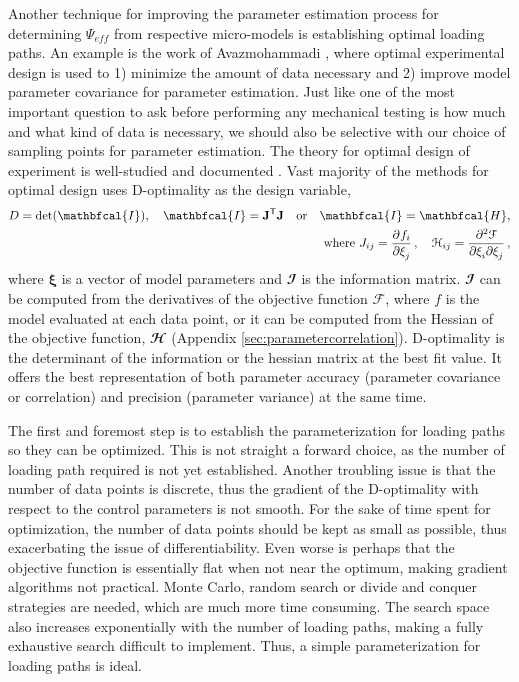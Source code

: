 	Another technique for improving the parameter estimation process for determining $\Psi_{eff}$ from respective micro-models is establishing optimal loading paths. An example is the work of Avazmohammadi \cite{Avazmohammadi2017b}, where optimal experimental design is used to 1) minimize the amount of data necessary and 2) improve model parameter covariance for parameter estimation. Just like one of the most important question to ask before performing any mechanical testing is how much and what kind of data is necessary, we should also be selective with our choice of sampling points for parameter estimation. The theory for optimal design of experiment is well-studied and documented \cite{lanir_optimal_1996, zhu_d_2014}. Vast majority of the methods for optimal design uses D-optimality as the design variable,
\begin{equation}\label{eqn:doptimality}
\begin{aligned}
D = \det(\mathbfcal{I}), \quad \mathbfcal{I} = \mathbf{J}^\mathsf{T}\mathbf{J} \quad \mathrm{or} \quad \mathbfcal{I} = \mathbfcal{H},	\\
\mathrm{where} \ J_{ij} = \dpd{f_i}{\xi_j}, \quad \mathcal{H}_{ij} = \dmd{\mathcal{F}}{2}{\xi_i}{}{\xi_j}{},
\end{aligned}
\end{equation}
    where $\mathbf{\xi}$ is a vector of model parameters and $\mathbfcal{I}$ is the information matrix. $\mathbfcal{I}$ can be computed from the derivatives of the objective function $\mathcal{F}$, where $f$ is the model evaluated at each data point, or it can be computed from the Hessian of the objective function, $\mathbfcal{H}$ (Appendix \ref{sec:parametercorrelation}). D-optimality is the determinant of the information or the hessian matrix at the best fit value. It offers the best representation of both parameter accuracy (parameter covariance or correlation) and precision (parameter variance) at the same time.

    
    The first and foremost step is to establish the parameterization for loading paths so they can be optimized. This is not straight a forward choice, as the number of loading path required is not yet established. Another troubling issue is that the number of data points is discrete, thus the gradient of the D-optimality with respect to the control parameters is not smooth. For the sake of time spent for optimization, the number of data points should be kept as small as possible, thus exacerbating the issue of differentiability. Even worse is perhaps that the objective function is essentially flat when not near the optimum, making gradient algorithms not practical. Monte Carlo, random search or divide and conquer strategies are needed, which are much more time consuming. The search space also increases exponentially with the number of loading paths, making a fully exhaustive search difficult to implement. Thus, a simple parameterization for loading paths is ideal. 
    

